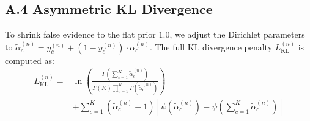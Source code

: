 \documentclass[letterpaper]{article} %
\begin{document}
\subsection{A.4 Asymmetric KL Divergence}
To shrink false evidence to the flat prior $1.0$, we adjust the Dirichlet parameters to $\tilde{\alpha}_c^{(n)} = y_c^{(n)} + (1 - y_c^{(n)}) \cdot \alpha_c^{(n)}$. The full KL divergence penalty $L_{\text{KL}}^{(n)}$ is computed as:
\begin{equation}
\begin{aligned}
    L_{\text{KL}}^{(n)} ={}& \ln \left( \frac{\Gamma\left(\sum_{c=1}^K \tilde{\alpha}_c^{(n)}\right)}{\Gamma(K) \prod_{c=1}^K \Gamma(\tilde{\alpha}_c^{(n)})} \right) \\
    &+ \sum_{c=1}^K (\tilde{\alpha}_c^{(n)} - 1)\left[\psi(\tilde{\alpha}_c^{(n)}) - \psi\!\left(\sum_{c=1}^K \tilde{\alpha}_c^{(n)}\right)\right]
\end{aligned}
\end{equation}
\end{document}

